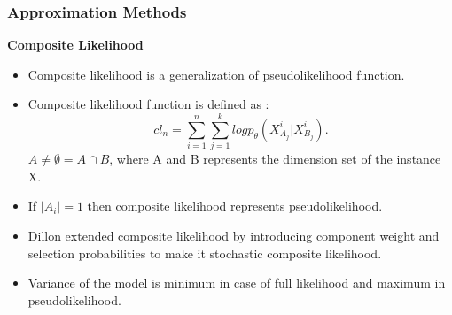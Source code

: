 \documentclass[10pt, blue,subsection=true, compress]{beamer}
\begin{document}
\begin{frame}\frametitle{Approximation Methods}
\begin{block}{\textbf{Composite Likelihood}}
\begin{itemize}
\item Composite likelihood is a generalization of pseudolikelihood function.
\item Composite likelihood function  is defined as :
\begin{equation}
\label{comp}
 cl_n = \sum_{i=1}^n \sum_{j=1}^k log p_{\theta}(X_{A_j}^i | X_{{B_j}}^i). 
\end{equation}
$A \neq \emptyset = A \cap B$, 
where A and B represents the dimension set of the instance X.  
\item If $|A_i| =1$ then composite likelihood represents pseudolikelihood. 
\item Dillon extended composite likelihood by introducing component weight and selection probabilities to make it stochastic composite likelihood.
\item Variance of the model is minimum in case of full likelihood and maximum in pseudolikelihood.
\end{itemize}
\end{block}

\end{frame}

\end{document}

